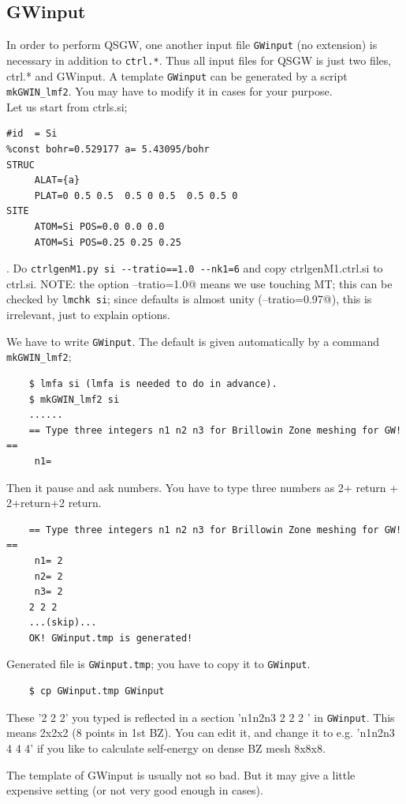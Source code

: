 \documentclass[a4paper,10pt,epsf,fleqn]{article}
\begin{document}
\subsection{GWinput}
\label{GWinput}
In order to perform QSGW, one another input file 
\verb+GWinput+ (no extension) is necessary in addition to \verb+ctrl.*+.
Thus all input files for QSGW is just two files, ctrl.* and GWinput.
A template \verb+GWinput+ can be generated by a script \verb+mkGWIN_lmf2+. 
You may have to modify it in cases for your purpose.\\

Let us start from ctrls.si;
\begin{verbatim}
#id  = Si
%const bohr=0.529177 a= 5.43095/bohr
STRUC
     ALAT={a} 
     PLAT=0 0.5 0.5  0.5 0 0.5  0.5 0.5 0 
SITE
     ATOM=Si POS=0.0 0.0 0.0
     ATOM=Si POS=0.25 0.25 0.25
\end{verbatim}
. Do \verb+ctrlgenM1.py si --tratio==1.0 --nk1=6+ and copy ctrlgenM1.ctrl.si to
ctrl.si. {\small NOTE: the option \verb@--tratio=1.0@ means we use touching MT; 
this can be checked by \verb+lmchk si+; since defaults is almost unity 
(\verb@--tratio=0.97@), this is irrelevant, just to explain options.} 

We have to write \verb+GWinput+. The default is given automatically by a
command \verb+mkGWIN_lmf2+;
\begin{verbatim}
    $ lmfa si (lmfa is needed to do in advance).
    $ mkGWIN_lmf2 si
    ......
    == Type three integers n1 n2 n3 for Brillowin Zone meshing for GW! ==
     n1=
\end{verbatim}
Then it pause and ask numbers. You have to type three numbers as
2+ return + 2+return+2 return.
\begin{verbatim}
    == Type three integers n1 n2 n3 for Brillowin Zone meshing for GW! ==
     n1= 2
     n2= 2
     n3= 2
    2 2 2
    ...(skip)...
    OK! GWinput.tmp is generated!
\end{verbatim}
Generated file is \verb+GWinput.tmp+; you have to copy it to \verb+GWinput+.
\begin{verbatim}
    $ cp GWinput.tmp GWinput
\end{verbatim}
These '2 2 2' you typed is reflected in a section 'n1n2n3 2 2 2 ' in
\verb+GWinput+. This means 2x2x2 (8 points in 1st BZ). 
You can edit it, and change it to e.g. 'n1n2n3 4 4 4' if you like to
calculate self-energy on dense BZ mesh 8x8x8. 

The template of GWinput is usually not so bad. But 
it may give a little expensive setting (or not very good enough in cases).
\end{document}
